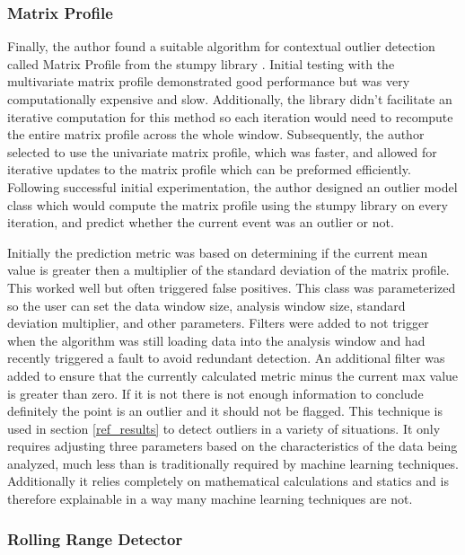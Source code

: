 \subsubsection{Matrix Profile}

Finally, the author found a suitable algorithm for contextual outlier detection called Matrix Profile from the stumpy library \cite{law2019stumpy}. Initial testing with the multivariate matrix profile demonstrated good performance but was very computationally expensive and slow. Additionally, the library didn't facilitate an iterative computation for this method so each iteration would need to recompute the entire matrix profile across the whole window. Subsequently, the author selected to use the univariate matrix profile, which was faster, and allowed for iterative updates to the matrix profile which can be preformed efficiently. Following successful initial experimentation, the author designed an outlier model class which would compute the matrix profile using the stumpy library on every iteration, and predict whether the current event was an outlier or not. 

Initially the prediction metric was based on determining if the current mean value is greater then a multiplier of the standard deviation of the matrix profile. This worked well but often triggered false positives. This class was parameterized so the user can set the data window size, analysis window size, standard deviation multiplier, and other parameters. Filters were added to not trigger when the algorithm was still loading data into the analysis window and had recently triggered a fault to avoid redundant detection. An additional filter was added to ensure that the currently calculated metric minus the current max value is greater than zero. If it is not there is not enough information to conclude definitely the point is an outlier and it should not be flagged. This technique is used in section \ref{ref_results} to detect outliers in a variety of situations. It only requires adjusting three parameters based on the characteristics of the data being analyzed, much less than is traditionally required by machine learning techniques. Additionally it relies completely on mathematical calculations and statics and is therefore explainable in a way many machine learning techniques are not. 

\subsubsection{Rolling Range Detector}

